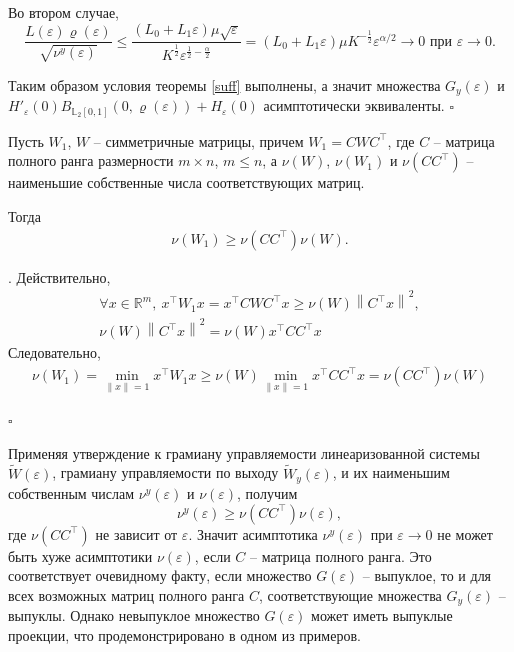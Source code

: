 \documentclass[../main.tex]{subfiles}
\begin{document}
	Во втором случае,
	\begin{equation*}
		\frac{L(\varepsilon) \varrho(\varepsilon)}{\sqrt{\nu^y(\varepsilon)}} 
		\leqslant
		\frac{(L_0+L_1\varepsilon)\mu\sqrt{\varepsilon}}{{K^{\frac{1}{2}}}\varepsilon^{\frac{1}{2}-\frac{\alpha}{2}}}
		=
		(L_0+L_1\varepsilon)\mu K^{-\frac{1}{2}}\varepsilon^{\alpha/2} \rightarrow 0 \mbox{\ при\ } \varepsilon \rightarrow 0.
	\end{equation*}
	
	Таким образом условия теоремы \ref{suff} выполнены, а значит множества $ G_y(\varepsilon) $ и \\ $ H'_{\varepsilon}(0)B_{\mathbb{L}_2[0,1]}(0,\varrho(\varepsilon))+ H_{\varepsilon}(0) $ асимптотически эквиваленты.
	\hfill $\square$
	\begin{utv}
		Пусть $ W_1 $, $ W $ -- симметричные матрицы, причем $ W_1 = C W C^{\top} $, где $ C $ -- матрица  полного ранга размерности $ m \times n $, $ m \leqslant n $, а $ \nu(W) $, $ \nu(W_1) $ и $ \nu(CC^{\top}) $ -- наименьшие собственные числа соответствующих матриц.
		
		Тогда
		\begin{gather*}
			\nu(W_1) \geqslant \nu(CC^{\top})  \nu(W).
		\end{gather*}
	\end{utv}
	\doc. 
	Действительно,
	\begin{gather*}
		\forall x \in \mathbb{R}^m, \: x^{\top} W_1 x = x^{\top} C W C^{\top} x \geqslant \nu(W)\left\| C^{\top}x \right\| ^2,\\
		\nu(W)\left\| C^{\top}x \right\| ^2 = \nu(W) x^{\top} C C^{\top} x
	\end{gather*}
	Следовательно,
	\begin{gather*}
		\nu(W_1) = \min \limits_{\left\| x\right\| =1}x^{\top}W_1x \geqslant \nu(W)\min \limits_{\left\| x\right\| =1}x^{\top}CC^{\top}x = \nu(CC^{\top})  \nu(W) 
	\end{gather*} \begin{flushright}
		\hfill $ \square $
	\end{flushright}
	
	Применяя утверждение к грамиану управляемости линеаризованной системы $ \widetilde{W}(\varepsilon) $, грамиану управляемости по выходу $ \widetilde{W}_y(\varepsilon) $, и их наименьшим собственным числам $ \nu^y(\varepsilon) $ и $ \nu(\varepsilon) $, получим
	\begin{equation*}
		\nu^y(\varepsilon) \geqslant \nu(CC^{\top}) \nu(\varepsilon),
	\end{equation*}
	где $ \nu(CC^{\top}) $ не зависит от $ \varepsilon $. Значит асимптотика $ \nu^y(\varepsilon) $ при $\varepsilon \rightarrow 0$ не может быть хуже асимптотики $ \nu(\varepsilon) $, если $ C $ -- матрица полного ранга. Это соответствует очевидному факту, если множество $ G(\varepsilon) $ -- выпуклое, то и для всех возможных матриц полного ранга $ C $, соответствующие множества $ {G}_y(\varepsilon) $ -- выпуклы. Однако невыпуклое множество $ G(\varepsilon) $  может иметь выпуклые проекции, что продемонстрировано в одном из примеров.
\end{document}
